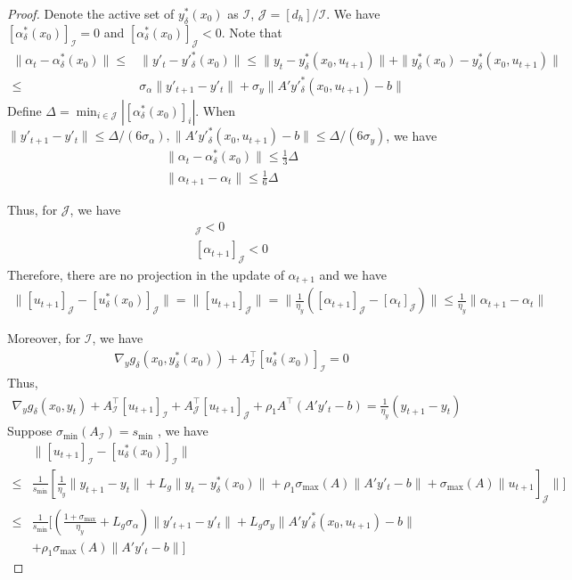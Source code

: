 \documentclass{article}
\newcommand{\Ic}{\mathcal{I}}
\newcommand{\Jc}{\mathcal{J}}
\newcommand{\pth}[1]{\left( #1 \right)}
\theoremstyle{plain}
\theoremstyle{definition}
\theoremstyle{remark}
\begin{document}
\begin{proof}

Denote the active set of $y^*_\delta(x_0)$ as $\Ic$, $\Jc=[d_h]/\Ic$. We have $[\alpha^*_\delta(x_0)]_\Ic=0$ and $[\alpha^*_\delta(x_0)]_\Jc< 0$.
Note that
\begin{align*}
    \|\alpha_t-\alpha^*_\delta(x_0)\|\leq&\|y'_t-y'^*_\delta(x_0)\|\leq \|y_t-y^*_\delta(x_0, u_{t+1})\|+\|y^*_\delta(x_0)-y^*_\delta(x_0, u_{t+1})\|\\
    \leq& \sigma_{\alpha}\|y'_{t+1}-y'_t\|+\sigma_{y}\|A'y'^*_\delta(x_0,u_{t+1})-b\|
\end{align*}
Define $\Delta=\min_{i\in\Jc}|[\alpha^*_\delta(x_0)]_i|$. When $\|y'_{t+1}-y'_t\|\leq \Delta/(6\sigma_{\alpha}), \|A'y'^*_\delta(x_0,u_{t+1})-b\|\leq \Delta/(6\sigma_y) $, we have
\begin{align*}
    \|\alpha_t-\alpha^*_\delta(x_0)\|\leq \frac{1}{3}\Delta\\
    \|\alpha_{t+1}-\alpha_t\|\leq \frac{1}{6}\Delta
\end{align*}

Thus, for $\Jc$, we have
\begin{align*}
    [\alpha_t]_\Jc < 0\\
    [\alpha_{t+1}]_\Jc < 0
\end{align*}
Therefore, there are no projection in the update of $\alpha_{t+1}$ and we have
\begin{align*}
    \|[u_{t+1}]_\Jc-[u^*_\delta(x_0)]_\Jc\|=\|[u_{t+1}]_\Jc\|=\|\frac{1}{\eta_y} ([\alpha_{t+1}]_\Jc-[\alpha_t]_\Jc)\|\leq \frac{1}{\eta_y}\|\alpha_{t+1}-\alpha_t\|
\end{align*}

Moreover, for $\Ic$, we have
\begin{align*}
    \nabla_y g_\delta(x_0, y^*_\delta(x_0))+A_\Ic^\top [u^*_\delta(x_0)]_\Ic=0
\end{align*}
Thus,
\begin{align*}
    \nabla_y g_\delta(x_0, y_t)+A_\Ic^\top [u_{t+1}]_\Ic+A_\Jc^\top [u_{t+1}]_\Jc+\rho_1 A^\top(A'y'_t-b)=\frac{1}{\eta_y}(y_{t+1}-y_t)
\end{align*}
Suppose $\sigma_{\min}(A_\Ic)=s_{\min}$ , we have
\begin{align*}
    &\|[u_{t+1}]_\Ic-[u^*_\delta(x_0)]_\Ic\|\\
    \leq& \frac{1}{s_{\min}} [\frac{1}{\eta_y}\|y_{t+1}-y_t\|+L_g\|y_t-y^*_\delta(x_0)\|+\rho_1 \sigma_{\max}(A)\|A'y'_t-b\|+\sigma_{\max}(A)\|u_{t+1}]_\Jc\|]\\
    \leq & \frac{1}{s_{\min}} \Bigg[\pth{\frac{1+\sigma_{\max}}{\eta_y}+L_g\sigma_\alpha}\|y'_{t+1}-y'_t\|+L_g\sigma_{y}\|A'y'^*_\delta(x_0,u_{t+1})-b\|\\
    &+\rho_1 \sigma_{\max}(A)\|A'y'_t-b\|\Bigg]
\end{align*}


\end{proof}
\end{document}

